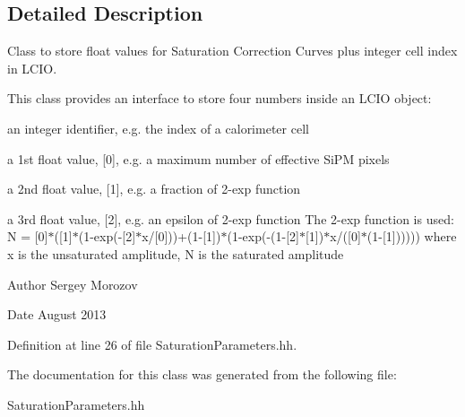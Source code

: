 \subsection{Detailed Description}
Class to store float values for Saturation Correction Curves plus integer cell index in L\-C\-I\-O. 

This class provides an interface to store four numbers inside an L\-C\-I\-O object\-:
\begin{DoxyItemize}
\item an integer identifier, e.\-g. the index of a calorimeter cell
\item a 1st float value, [0], e.\-g. a maximum number of effective Si\-P\-M pixels
\item a 2nd float value, [1], e.\-g. a fraction of 2-\/exp function
\item a 3rd float value, [2], e.\-g. an epsilon of 2-\/exp function The 2-\/exp function is used\-: N = [0]$\ast$([1]$\ast$(1-\/exp(-\/[2]$\ast$x/[0]))+(1-\/[1])$\ast$(1-\/exp(-\/(1-\/[2]$\ast$[1])$\ast$x/([0]$\ast$(1-\/[1]))))) where x is the unsaturated amplitude, N is the saturated amplitude
\end{DoxyItemize}

\begin{DoxyAuthor}{Author}
Sergey Morozov 
\end{DoxyAuthor}
\begin{DoxyDate}{Date}
August 2013 
\end{DoxyDate}


Definition at line 26 of file Saturation\-Parameters.\-hh.



The documentation for this class was generated from the following file\-:\begin{DoxyCompactItemize}
\item 
Saturation\-Parameters.\-hh\end{DoxyCompactItemize}
